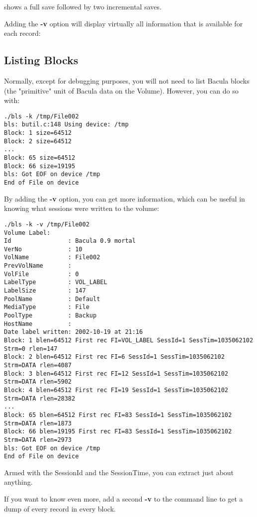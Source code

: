 shows a full save followed by two incremental saves.

Adding the {\bf -v} option will display virtually all information that is
available for each record:

\subsection{Listing Blocks}

Normally, except for debugging purposes, you will not need to list Bacula
blocks (the "primitive" unit of Bacula data on the Volume). However, you can
do so with:

\footnotesize
\begin{verbatim}
./bls -k /tmp/File002
bls: butil.c:148 Using device: /tmp
Block: 1 size=64512
Block: 2 size=64512
...
Block: 65 size=64512
Block: 66 size=19195
bls: Got EOF on device /tmp
End of File on device
\end{verbatim}
\normalsize

By adding the {\bf -v} option, you can get more information, which can be
useful in knowing what sessions were written to the volume:

\footnotesize
\begin{verbatim}
./bls -k -v /tmp/File002
Volume Label:
Id                : Bacula 0.9 mortal
VerNo             : 10
VolName           : File002
PrevVolName       :
VolFile           : 0
LabelType         : VOL_LABEL
LabelSize         : 147
PoolName          : Default
MediaType         : File
PoolType          : Backup
HostName          :
Date label written: 2002-10-19 at 21:16
Block: 1 blen=64512 First rec FI=VOL_LABEL SessId=1 SessTim=1035062102 Strm=0 rlen=147
Block: 2 blen=64512 First rec FI=6 SessId=1 SessTim=1035062102 Strm=DATA rlen=4087
Block: 3 blen=64512 First rec FI=12 SessId=1 SessTim=1035062102 Strm=DATA rlen=5902
Block: 4 blen=64512 First rec FI=19 SessId=1 SessTim=1035062102 Strm=DATA rlen=28382
...
Block: 65 blen=64512 First rec FI=83 SessId=1 SessTim=1035062102 Strm=DATA rlen=1873
Block: 66 blen=19195 First rec FI=83 SessId=1 SessTim=1035062102 Strm=DATA rlen=2973
bls: Got EOF on device /tmp
End of File on device
\end{verbatim}
\normalsize

Armed with the SessionId and the SessionTime, you can extract just about
anything.

If you want to know even more, add a second {\bf -v} to the command line to
get a dump of every record in every block.


